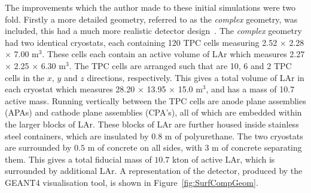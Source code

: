 The improvements which the author made to these initial simulations were two fold. Firstly a more detailed geometry, referred to as the \emph{complex} geometry, was included, this had a much more realistic detector design~\citep{LBNE3383}. The \emph{complex} geometry had two identical cryostats, each containing 120 TPC cells measuring 2.52 $\times$ 2.28 $\times$ 7.00 m$^3$. These cells each contain an active volume of LAr which measures 2.27 $\times$ 2.25 $\times$ 6.30 m$^3$. The TPC cells are arranged such that are 10, 6 and 2 TPC cells in the $x$, $y$ and $z$ directions, respectively. This gives a total volume of LAr in each cryostat which measures 28.20 $\times$ 13.95 $\times$ 15.0 m$^3$, and has a mass of 10.7 active mass. Running vertically between the TPC cells are anode plane assemblies (APAs) and cathode plane assemblies (CPA's), all of which are embedded within the larger blocks of LAr. These blocks of LAr are further housed inside stainless steel containers, which are insulated by $0.8$ m of polyurethane. The two cryostats are surrounded by $0.5$ m of concrete on all sides, with $3$ m of concrete separating them. This gives a total fiducial mass of $10.7$ kton of active LAr, which is surrounded by additional LAr. A representation of the detector, produced by the GEANT4 visualisation tool, is shown in Figure~\ref{fig:SurfCompGeom}. \\


